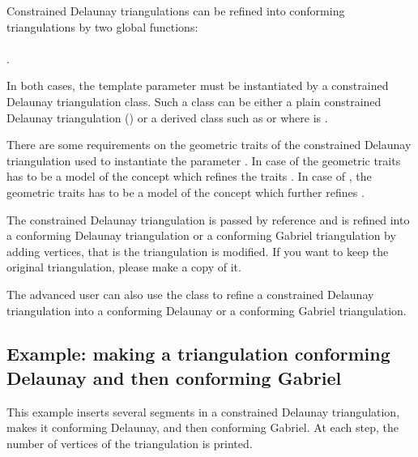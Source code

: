 Constrained Delaunay triangulations can be refined into
conforming triangulations 
by two global functions: \\
 \\
. 

In both cases, the template parameter  must be instantiated
by a constrained Delaunay triangulation class.  Such a class can be
either a plain constrained Delaunay triangulation
() or a derived
class such as  or
 where  is
.

There are some requirements on the geometric traits of the constrained
Delaunay triangulation used to instantiate the parameter .
In case of  the geometric
traits has to be a model of the concept
 which refines the traits
.  In case of
, the geometric traits has to
be a model of the concept 
which further refines .

The constrained Delaunay triangulation  is passed by reference
and is refined into a conforming Delaunay triangulation or a
conforming Gabriel triangulation by adding vertices, that is the
triangulation is modified. If you want to keep the original
triangulation, please make a copy of it.

The advanced user can also use the class
 to refine a constrained
Delaunay triangulation into a conforming Delaunay or a conforming
Gabriel triangulation.

\subsection{Example: making a triangulation conforming Delaunay and then
  conforming Gabriel}
\label{sec:Mesh_2_example_making_conforming}

This example inserts several segments in a constrained Delaunay
triangulation, makes it conforming Delaunay, and then conforming
Gabriel. At each step, the number of vertices of the triangulation is
printed.


